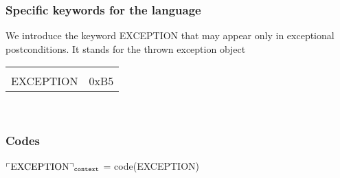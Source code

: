 \begin{appendix}
\subsubsection{Specific keywords for the language} 
We introduce the keyword  \textrm{EXCEPTION} that may appear only in exceptional postconditions. It stands for the thrown exception  object
\begin{center}
\begin{tabular}{|c|c|}
\hline \\
\textrm{EXCEPTION} & 0xB5 \\
\hline
\end{tabular}\\[2 mm]
\subsubsection{Codes}
\end{center}
$\ulcorner \rm{EXCEPTION} \urcorner_{\tt{context}} $ = code(\textrm{EXCEPTION}) \\\\\\\\\\\\\\
 





\end{appendix}
